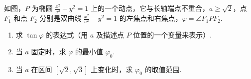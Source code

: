 \documentclass[UTF8,a4paper,oneside,11pt]{ctexbook}
\begin{document}
\begin{problem}
如图，\(P\) 为椭圆 \(\frac{x^2}{a^2} + y^2 = 1\) 上的一个动点，它与长轴端点不重合，\(a \geqslant \sqrt{2}\)，点 \(F_1\) 和点 \(F_2\) 分别是双曲线 \(\frac{x^2}{a^2} - y^2 = 1\) 的左焦点和右焦点，\(\varphi = \angle F_1PF_2\).

\begin{enumerate}
\item 求 \(\tan\varphi\) 的表达式（用 \(a\) 及描述点 \(P\) 位置的一个变量来表示）.
\item 当 \(a\) 固定时，求 \(\varphi\) 的最小值 \(\varphi_0\).
\item 当 \(a\) 在区间 \([\sqrt{2}, \sqrt{3}]\) 上变化时，求 \(\varphi_0\) 的取值范围.
\end{enumerate}

\end{problem}
\end{document}
